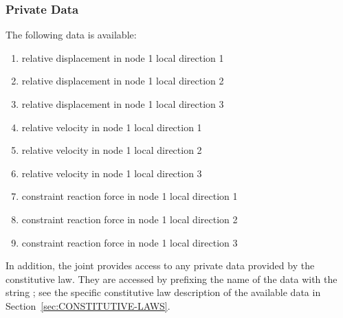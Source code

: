 \subsubsection{Private Data}
The following data is available:
\begin{enumerate}
\item {} relative displacement in node 1 local direction 1
\item {} relative displacement in node 1 local direction 2
\item {} relative displacement in node 1 local direction 3
\item {} relative velocity in node 1 local direction 1
\item {} relative velocity in node 1 local direction 2
\item {} relative velocity in node 1 local direction 3
\item {} constraint reaction force in node 1 local direction 1
\item {} constraint reaction force in node 1 local direction 2
\item {} constraint reaction force in node 1 local direction 3
\end{enumerate}
In addition, the joint provides
access to any private data provided by the constitutive law.
They are accessed by prefixing the name of the data with the string
; see the specific constitutive law
description of the available data in Section~\ref{sec:CONSTITUTIVE-LAWS}.

